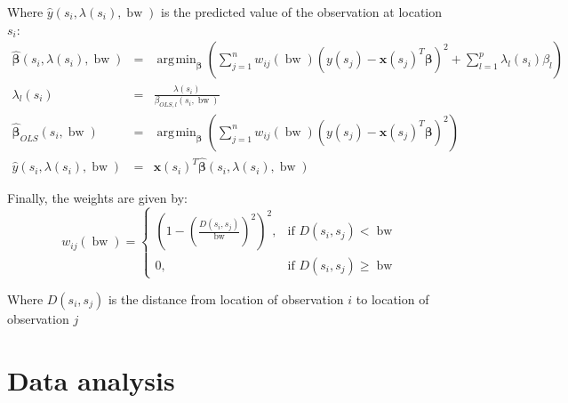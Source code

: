 \documentclass[authoryear, review, 11pt]{elsarticle}
\DeclareMathOperator*{\argmin}{\arg\!\min}
\DeclareMathOperator*{\bw}{\mbox{bw}}
\begin{document}
		Where $\hat{y}\left(s_i, \lambda(s_i), \bw \right)$ is the predicted value of the observation at location $s_i$:
		\begin{eqnarray*}
			\hat{\bm{\beta}}\left(s_i, \lambda(s_i), \bw \right) &=& \argmin_{\bm{\beta}} \left( \sum_{j = 1}^n w_{ij}(\bw)\left(y(s_j) - \bm{x}(s_j)^T \bm{\beta}\right)^2  +  \sum_{l=1}^p \lambda_{l}(s_i) \beta_l \right)\\
			\lambda_{l}(s_i) &=& \frac{\lambda(s_i)}{\beta_{OLS,l}(s_i, \bw)}\\
			\hat{\bm{\beta}}_{OLS}(s_i, \bw) &=& \argmin_{\bm{\beta}} \left( \sum_{j=1}^{n} w_{ij}(\bw)\left(y(s_j) - \bm{x}(s_j)^T \bm{\beta}\right)^2\right)\\
			\hat{y}\left(s_i, \lambda(s_i), \bw \right) &=& \bm{x}(s_i)^T \hat{\bm{\beta}}\left(s_i, \lambda(s_i), \bw \right)
		\end{eqnarray*}
		
		Finally, the weights are given by:
		\[
			w_{ij}(\bw) =  \begin{cases} \left(1-\left(\frac{D(s_i,s_j)}{\bw}\right)^2\right)^2, & \mbox{if } D(s_i,s_j) < \bw \\
			0, & \mbox{if }D(s_i,s_j) \ge \bw \end{cases}
		\]
		
		Where $D(s_i,s_j)$ is the distance from location of observation $i$ to location of observation $j$\\
		
		
	\section{Data analysis}
\end{document}

